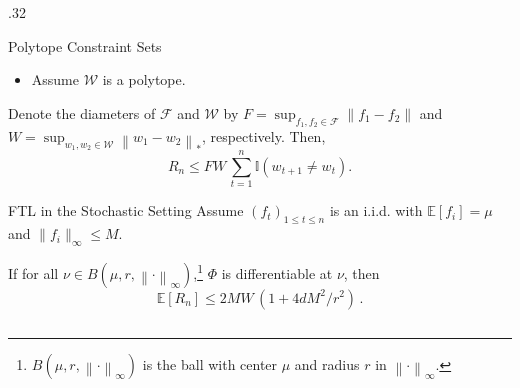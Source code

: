 \documentclass[final]{beamer} %
\newcommand{\cW}{\mathcal{W}}
\newcommand{\cF}{\mathcal{F}}
\newcommand{\ind}{\mathbb{I}}
\newcommand{\Exp}[1]{\mathbb{E}\left[ #1 \right]}
\newcommand{\norm}[1]{\left\| #1 \right\|}
\begin{document}
\begin{frame}[c]
\begin{columns}[t,totalwidth=\textwidth]
\begin{column} {.32\textwidth}
		\vspace{0.0ex}
		\begin{block}{Polytope Constraint Sets }
			\begin{itemize}
				\item Assume $\cW$ is a polytope.
			\end{itemize}
			\medskip
			\begin{tcolorbox}[title = \vspace{0.4cm}\textbf{\large Result III (Upper Bound)} \vspace{0.4cm}, title filled, width = 0.9\textwidth, colback = uofagreen!10, colframe = red, arc = 16pt]
				Denote the diameters of $\cF$ and $\cW$ by $F = \sup_{f_1,f_2\in \cF} \norm{f_1-f_2}$ and $W = \sup_{w_1,w_2\in \cW}  \norm{w_1-w_2}_*$, respectively.
				Then,
				 \[R_n \le FW\, \sum_{t=1}^{n} \ind(w_{t+1}\neq w_{t}).\]
			\end{tcolorbox}

				\begin{block}{FTL in the Stochastic Setting}
					\vspace{-1cm}
					Assume  $(f_t)_{1\le t \le n}$ is an i.i.d. with $\Exp{f_i} = \mu$ and $\|f_i\|_\infty \le M$. 
					\vspace{1cm}
					\begin{tcolorbox}[title = \vspace{0.4cm}{Constant regret of FTL} \vspace{0.4cm}, title filled, colbacktitle = uofagreen!10, width = 0.9\textwidth, colback = uofagreen!10, colframe = red, coltitle = black, arc = 16pt]
						If for all $\nu \in B(\mu,r, \norm{\cdot}_\infty)$,\footnote{$ B(\mu,r, \norm{\cdot}_\infty)$ is the ball with center $\mu$ and radius $r$ in $\norm{\cdot}_\infty$.} $\Phi$ is differentiable at $\nu$,
						then
						$$\Exp{R_n} \le 2MW \, (1+4d M^2/r^2 )\,.$$
					\end{tcolorbox}
				\end{block}
			\vspace{-0.3em}
		\end{block}
	

\end{column}
\end{columns}
\end{frame}
\end{document}

